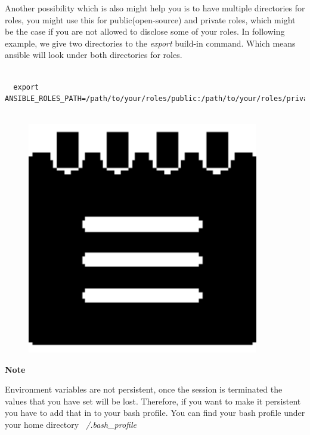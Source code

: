 \documentclass[10pt]{book}
\begin{document}
Another possibility which is also might help you is to have multiple directories 
for roles, you might use this for public(open-source) and private roles, which might be the 
case if you are not allowed to disclose some of your roles. In following example, 
we give two directories to the \emph{export} build-in command. Which means 
ansible will look under both directories for roles.

\begin{verbatim}
  
  export ANSIBLE_ROLES_PATH=/path/to/your/roles/public:/path/to/your/roles/private
   
\end{verbatim}


\begin{mdframed}[style=noteStyle]
\begin{minipage}[b]{0.05\textwidth}
\begin{figure}[H]
\includegraphics[width=0.9\textwidth]{figures/notes-icon.eps} 
\end{figure}
\end{minipage}  
\begin{minipage}[b]{0.05\textwidth}
\textbf{Note}
\end{minipage}

Environment variables are not persistent, once the session is terminated the 
values that you have set will be lost. Therefore, if you want to make it 
persistent you have to add that in to your bash profile. You can find your bash 
profile under your home directory  \emph{~/.bash\_profile}
\end{mdframed}
 
\end{document}
